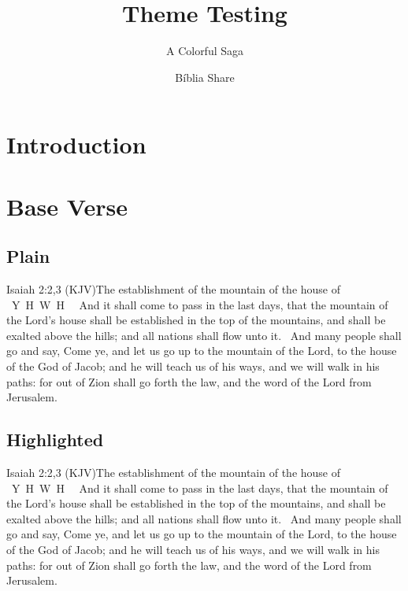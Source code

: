 \documentclass[aspectratio=169]{beamer}
\title{Theme Testing}
\subtitle{A Colorful Saga}
\author{Bíblia Share}
\date{\space}%
\newcommand{\YA}{%
    \mbox{%
        Y\makebox[0pt][l]{\hspace{-0.178em}\raisebox{-0.00ex}{\scalebox{0.30}{E}}}%
        H\makebox[0pt][l]{\hspace{-0.010em}\raisebox{-0.00ex}{\scalebox{0.30}{O}}}%
        W\makebox[0pt][l]{\hspace{-0.245em}\raisebox{-0.00ex}{\scalebox{0.30}{A}}}%
        H%
    }%
}
\newcommand{\ver}[1]{%
    \raisebox{0.75ex}{%
        \scalebox{1.1}{%
            \pmb{\textbf{\textcolor{BSpbg}{#1}}}%
        }%
    }%
}
\newcommand{\RED}[1]{{\textcolor{TXred}{#1}}}
\newcommand{\YEL}[1]{{\textcolor{TXyel}{#1}}}
\newcommand{\GRE}[1]{{\textcolor{TXgre}{#1}}}
\newcommand{\CYA}[1]{{\textcolor{TXcya}{#1}}}
\newcommand{\BLU}[1]{{\textcolor{TXblu}{#1}}}
\newcommand{\MAG}[1]{{\textcolor{TXmag}{#1}}}
\begin{document}
    \begin{frame}
        \titlepage
    \end{frame}

    \section{Introduction}

    \section{Base Verse}

    \subsection{Plain}

    \begin{frame}{Isaiah 2:2,3 (KJV)}{The establishment of the mountain of the house of \YA}
        \linespread{1.25}\Large
        \ver{2}~And it shall come to pass in the last days, that  the  mountain  of  the  Lord's
        house shall be established in the top of the mountains, and shall be exalted  above  the
        hills; and all nations shall flow unto it.
        \ver{3}~And many people shall go and say, Come ye, and let us go up to the  mountain  of
        the Lord, to the house of the God of Jacob; and he will teach us of  his  ways,  and  we
        will walk in his paths: for out of Zion shall go forth the law, and the word of the Lord
        from Jerusalem.
    \end{frame}

    \subsection{Highlighted}

    \begin{frame}{Isaiah 2:2,3 (KJV)}{The establishment of the mountain of the house of \YA}
        \linespread{1.25}\Large
        \ver{2}~And \RED{it shall come to pass} in the last  days,  that  the  mountain  of  the
        Lord's house shall be \YEL{established} in the \CYA{top of the mountains}, and shall  be
        \CYA{exalted} above the hills; and \GRE{all nations} shall flow unto it.
        \ver{3}~And \GRE{many people} shall go and say, Come ye, and let us \CYA{go up}  to  the
        mountain of the Lord, to the house of the \BLU{God of Jacob}; and he will \MAG{teach} us
        of his ways, and we will \MAG{walk} in his paths: for \YEL{out of Zion} shall  go  forth
        the \YEL{law,} and the word of the Lord \YEL{from Jerusalem}.
    \end{frame}
\end{document}
